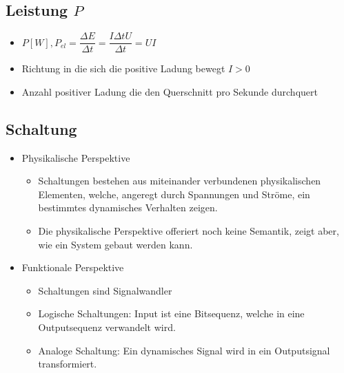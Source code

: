 \documentclass[6pt,a4paper]{scrartcl}
\begin{document}
\begin{multicols*}{4}
		\subsection{Leistung $P$}
			\begin{itemize}\itemsep0pt				
				\item $P [W], P_{el}=\dfrac{\Delta E}{\Delta t} = \dfrac{I \Delta t U}{\Delta t} = UI$
				\item Richtung in die sich die positive Ladung bewegt $I>0$
				\item Anzahl positiver Ladung die den Querschnitt pro Sekunde durchquert
			\end{itemize}
			
		\subsection{Schaltung}
			\begin{itemize}\itemsep0pt
				\item Physikalische Perspektive
				\begin{itemize}\itemsep0pt
					\item Schaltungen bestehen aus miteinander verbundenen physikalischen Elementen, welche, angeregt durch Spannungen und Ströme, ein bestimmtes dynamisches Verhalten zeigen.
					\item Die physikalische Perspektive offeriert noch keine Semantik, zeigt aber, wie ein System gebaut werden kann.
				\end{itemize}					
			
				\item Funktionale Perspektive
				\begin{itemize}\itemsep0pt
					\item Schaltungen sind Signalwandler
					\item Logische Schaltungen: Input ist eine Bitsequenz, welche in eine Outputsequenz verwandelt wird.
					\item Analoge Schaltung: Ein dynamisches Signal wird in ein Outputsignal transformiert.
				\end{itemize}						
			\end{itemize}		

\end{multicols*}
\end{document}
